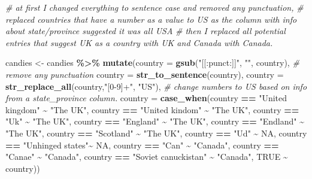 \documentclass[
]{article}
\newenvironment{Shaded}{\begin{snugshade}}{\end{snugshade}}
\newcommand{\AttributeTok}[1]{\textcolor[rgb]{0.13,0.29,0.53}{#1}}
\newcommand{\CommentTok}[1]{\textcolor[rgb]{0.56,0.35,0.01}{\textit{#1}}}
\newcommand{\ConstantTok}[1]{\textcolor[rgb]{0.56,0.35,0.01}{#1}}
\newcommand{\FunctionTok}[1]{\textcolor[rgb]{0.13,0.29,0.53}{\textbf{#1}}}
\newcommand{\NormalTok}[1]{#1}
\newcommand{\OtherTok}[1]{\textcolor[rgb]{0.56,0.35,0.01}{#1}}
\newcommand{\SpecialCharTok}[1]{\textcolor[rgb]{0.81,0.36,0.00}{\textbf{#1}}}
\newcommand{\StringTok}[1]{\textcolor[rgb]{0.31,0.60,0.02}{#1}}
\begin{document}
\begin{Shaded}
\begin{Highlighting}[]
\CommentTok{\# at first I changed everything to sentence case and removed any punctuation, }
\CommentTok{\#  replaced countries that have a number as a value to \textquotesingle{}US\textquotesingle{} as the column with info about state/province suggested it was all USA}
\CommentTok{\# then I replaced all potential entries that suggest UK as a country with \textquotesingle{}UK\textquotesingle{} and Canada with \textquotesingle{}Canada\textquotesingle{}.}

\NormalTok{candies }\OtherTok{\textless{}{-}}\NormalTok{ candies }\SpecialCharTok{\%\textgreater{}\%} 
  \FunctionTok{mutate}\NormalTok{(}\AttributeTok{country =} \FunctionTok{gsub}\NormalTok{(}\StringTok{"[[:punct:]]"}\NormalTok{, }\StringTok{""}\NormalTok{, country),   }\CommentTok{\# remove any punctuation}
       \AttributeTok{country =} \FunctionTok{str\_to\_sentence}\NormalTok{(country),}
       \AttributeTok{country =} \FunctionTok{str\_replace\_all}\NormalTok{(country,}\StringTok{"[0{-}9]+"}\NormalTok{, }\StringTok{"US"}\NormalTok{), }\CommentTok{\# change numbers to US based on info from a \textquotesingle{}state\_province\textquotesingle{} column. }
       \AttributeTok{country =} \FunctionTok{case\_when}\NormalTok{(country }\SpecialCharTok{==} \StringTok{"United kingdom"} \SpecialCharTok{\textasciitilde{}} \StringTok{"The UK"}\NormalTok{,}
\NormalTok{                           country }\SpecialCharTok{==} \StringTok{"United kindom"}  \SpecialCharTok{\textasciitilde{}} \StringTok{"The UK"}\NormalTok{,}
\NormalTok{                           country }\SpecialCharTok{==} \StringTok{"Uk"}             \SpecialCharTok{\textasciitilde{}} \StringTok{"The UK"}\NormalTok{,}
\NormalTok{                           country }\SpecialCharTok{==} \StringTok{"England"}        \SpecialCharTok{\textasciitilde{}} \StringTok{"The UK"}\NormalTok{,}
\NormalTok{                           country }\SpecialCharTok{==} \StringTok{"Endland"}        \SpecialCharTok{\textasciitilde{}} \StringTok{"The UK"}\NormalTok{,}
\NormalTok{                           country }\SpecialCharTok{==} \StringTok{"Scotland"}       \SpecialCharTok{\textasciitilde{}} \StringTok{"The UK"}\NormalTok{,}
\NormalTok{                           country }\SpecialCharTok{==} \StringTok{"Ud"}             \SpecialCharTok{\textasciitilde{}} \ConstantTok{NA}\NormalTok{,}
\NormalTok{                           country }\SpecialCharTok{==} \StringTok{"Unhinged states"}\SpecialCharTok{\textasciitilde{}} \ConstantTok{NA}\NormalTok{,}
\NormalTok{                           country }\SpecialCharTok{==} \StringTok{"Can"}            \SpecialCharTok{\textasciitilde{}} \StringTok{"Canada"}\NormalTok{,}
\NormalTok{                           country }\SpecialCharTok{==} \StringTok{"Canae"}          \SpecialCharTok{\textasciitilde{}} \StringTok{"Canada"}\NormalTok{,}
\NormalTok{                           country }\SpecialCharTok{==} \StringTok{"Soviet canuckistan"} \SpecialCharTok{\textasciitilde{}} \StringTok{"Canada"}\NormalTok{,}
                           \ConstantTok{TRUE}                        \SpecialCharTok{\textasciitilde{}}\NormalTok{ country))}
               

\end{Highlighting}
\end{Shaded}
\end{document}
